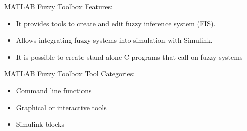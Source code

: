 \documentclass[hyperref={unicode}]{beamer}
\begin{document}
\begin{frame}{MATLAB Fuzzy Toolbox}
	 Features:
	\begin{itemize}
		\item It provides tools to create and edit fuzzy inference system (FIS).
		\item Allows integrating fuzzy systems into simulation with Simulink.
		\item It is possible to create stand-alone C programs that call on fuzzy systems
	\end{itemize}
	MATLAB Fuzzy Toolbox Tool Categories:
	\begin{itemize}
		\item Command line functions
		\item Graphical or interactive tools
		\item Simulink blocks
	\end{itemize}
\end{frame}
\end{document}
